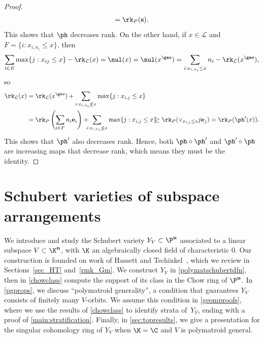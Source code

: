 \begin{proof}
\begin{align*}
    = \rk_P(\mathbf s).
  \end{align*}
  This shows that $\ph$ decreases rank.
  On the other hand, if $x \in \mathcal L$ and $F = \{i : x_{i, n_i} \leq x\}$, then
  \[ \sum_{i \in E} \max \{j : x_{ij} \leq x\} - \rk_{\mathcal L}(x) = \nul(x) = \nul(x^\geo) = \sum_{i: x_{i, n_i} \leq x} n_i - \rk_{\mathcal L}(x^\geo), \]
  so
  \begin{align*}
    \rk_{\mathcal L}(x) &= \rk_{\mathcal L}(x^\geo) + \sum_{i : x_{i, n_i} \not \leq x} \max\{j : x_{i,j} \leq x\}\\
    &= \rk_P\left(\sum_{i \in F} n_i \mathbf e_i\right) + \hspace{-0.2cm} \sum_{i : x_{i, n_i} \not \leq x} \max\{j : x_{i,j} \leq x\} \hspace{-0.2cm}
    \geq \rk_P( \vee_{x_{i,j} \leq x} j \mathbf e_j) = \rk_P(\ph'(x)).
  \end{align*}
  This shows that $\ph'$ also decreases rank.
  Hence, both $\ph \circ \ph'$ and $\ph' \circ \ph$ are increasing maps that decrease rank, which means they must be the identity.
\end{proof}

\section{Schubert varieties of subspace arrangements}\label{sec:polymatroidschubert}
We introduce and study the Schubert variety $Y_V \subset \P^{\mathbf n}$ associated to a linear subspace $V \subset \K^{\mathbf n}$, with $\K$ an algebraically closed field of characteristic 0.
Our construction is founded on work of Hassett and Tschinkel~\cite{HT99}, which we review in Sections~\ref{sec_HT} and~\ref{rmk_Gm}.
We construct $Y_V$ in \cref{polymatschubertdfn}, then in \cref{chowclass} compute the support of its class in the Chow ring of $\P^{\mathbf n}$.
In \cref{pgprops}, we discuss ``polymatroid generality'', a condition that guarantees $Y_V$ consists of finitely many $V$-orbits.
We assume this condition in \cref{geomproofs}, where we use the results of \cref{chowclass} to identify strata of~$Y_V$, ending with a proof of \cref{main:stratification}.
Finally, in \cref{sec:topresults}, we give a presentation for the singular cohomology ring of $Y_V$ when $\K = \C$ and $V$ is polymatroid general.


